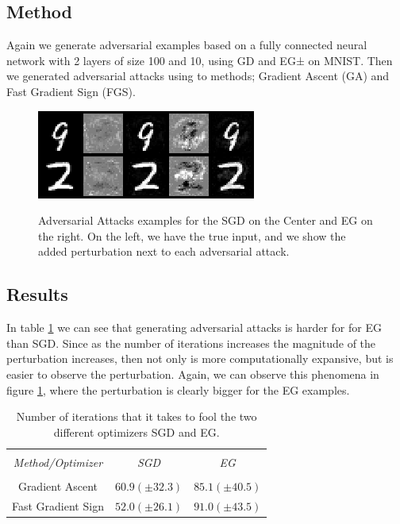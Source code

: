 \documentclass{asaproc}
\begin{document}
\subsection*{Method}

Again we generate adversarial examples based on a fully connected neural network with 2 layers of size 100 and 10, using GD and EG± on MNIST. Then we generated   adversarial attacks using to methods; Gradient Ascent (GA) and Fast Gradient Sign (FGS). 

\begin{figure}
	\centering
	\caption{\enspace Adversarial Attacks examples for the SGD on the Center and EG on the right. On the left, we have the true input, and we show the added perturbation next to each adversarial attack.}
	\includegraphics[width=\linewidth]{mnist_attacks.png}
	\label{fig6}
\end{figure}

\subsection*{Results}

In table \ref{tab2} we can see that generating adversarial attacks is harder for for EG than SGD. Since as the number of iterations increases the magnitude of the perturbation increases, then not only is more computationally expansive, but is easier to observe the perturbation. Again, we can observe this phenomena in figure \ref{fig6}, where the perturbation is clearly bigger for the EG examples.

\begin{table}
	\caption{\enspace Number of iterations that it takes to fool the two different optimizers SGD and EG.}
	\label{tab2}
	\begin{tabular*}{\hsize}{@{\extracolsep{\fill}}ccc}
		\hline
		\\[-7pt]
		\multicolumn{1}{c}{\it Method/Optimizer} & 
		\multicolumn{1}{c}{\it SGD}              & 
		\multicolumn{1}{c}{\it EG}               \\ 
		\hline
		\\[-5pt] 
		Gradient Ascent    & $60.9 (\pm 32.3)$ & $85.1 (\pm 40.5)$ \\ 
		Fast Gradient Sign & $52.0 (\pm 26.1)$ & $91.0 (\pm 43.5)$
	\end{tabular*}
\end{table}
\end{document}
